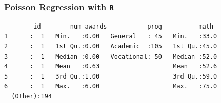 \documentclass[00-GLMregslides.tex]{subfiles}
\begin{document}
%
%

\begin{frame}[fragile]
	
\frametitle{Poisson Regression with \texttt{R}}
\normalsize
	\begin{verbatim}
        id        num_awards           prog          math     
1      :  1   Min.   :0.00   General   : 45   Min.   :33.0  
2      :  1   1st Qu.:0.00   Academic  :105   1st Qu.:45.0  
3      :  1   Median :0.00   Vocational: 50   Median :52.0  
4      :  1   Mean   :0.63                    Mean   :52.6  
5      :  1   3rd Qu.:1.00                    3rd Qu.:59.0  
6      :  1   Max.   :6.00                    Max.   :75.0  
  (Other):194
\end{verbatim}
\end{frame}
\end{document}
